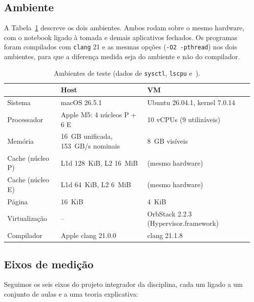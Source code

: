 \documentclass[12pt]{article}
\begin{document}
\subsection{Ambiente}

A Tabela~\ref{tab:amb} descreve os dois ambientes. Ambos rodam sobre o mesmo
hardware, com o notebook ligado à tomada e demais aplicativos fechados. Os
programas foram compilados com \texttt{clang} 21 e as mesmas opções
(\texttt{-O2 -pthread}) nos dois ambientes, para que a diferença medida seja do
ambiente e não do compilador.

\begin{table}[ht]
\centering
\caption{Ambientes de teste (dados de \texttt{sysctl}, \texttt{lscpu} e~\cite{apple2026}).}
\label{tab:amb}
\footnotesize
\begin{tabular}{lll}
\hline
 & \textbf{Host} & \textbf{VM} \\ \hline
Sistema & macOS 26.5.1 & Ubuntu 26.04.1, kernel 7.0.14 \\
Processador & Apple M5: 4 núcleos P + 6 E & 10 vCPUs (9 utilizáveis) \\
Memória & 16~GB unificada, 153~GB/s nominais & 8~GB visíveis \\
Cache (núcleo P) & L1d 128~KiB, L2 16~MiB & (mesmo hardware) \\
Cache (núcleo E) & L1d 64~KiB, L2 6~MiB & (mesmo hardware) \\
Página & 16~KiB & 4~KiB \\
Virtualização & -- & OrbStack 2.2.3 (Hypervisor.framework) \\
Compilador & Apple clang 21.0.0 & clang 21.1.8 \\
\hline
\end{tabular}
\end{table}

\subsection{Eixos de medição}

Seguimos os seis eixos do projeto integrador da disciplina, cada um ligado a um
conjunto de aulas e a uma teoria explicativa:
\end{document}
